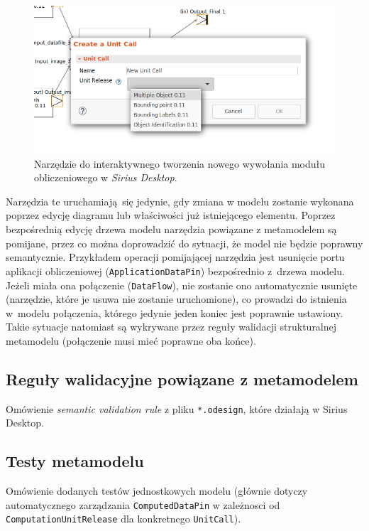 \begin{figure}[!hb]
	\centering

	\includegraphics[width=0.95\linewidth]{./images/sirius-desktop-create-unit-call-tool.png}
	\caption{Narzędzie do interaktywnego tworzenia nowego wywołania modułu
		obliczeniowego w \emph{Sirius Desktop}.}\label{rys:sirius-desktop-create-unit-call-tool}
\end{figure}

Narzędzia te uruchamiają się jedynie, gdy zmiana w modelu zostanie wykonana
poprzez edycję diagramu lub właściwości już istniejącego elementu. Poprzez
bezpośrednią edycję drzewa modelu narzędzia powiązane z metamodelem są
pomijane, przez co można doprowadzić do sytuacji, że model nie będzie poprawny
semantycznie. Przykładem operacji pomijającej narzędzia jest usunięcie portu
aplikacji obliczeniowej (\texttt{ApplicationDataPin}) bezpośrednio z~drzewa
modelu. Jeżeli miała ona połączenie (\texttt{DataFlow}), nie zostanie ono
automatycznie usunięte (narzędzie, które je usuwa nie zostanie uruchomione), co
prowadzi do istnienia w~modelu połączenia, którego jedynie jeden koniec jest
poprawnie ustawiony. Takie sytuacje natomiast są wykrywane przez reguły
walidacji strukturalnej metamodelu (połączenie musi mieć poprawne oba końce).

\subsection{Reguły walidacyjne powiązane z
	metamodelem}\label{sec:reguly-walidacyjne-metamodel}

Omówienie \textit{semantic validation rule} z pliku \texttt{*.odesign}, które
działają w Sirius Desktop.

\subsection{Testy metamodelu}

Omówienie dodanych testów jednostkowych modelu (głównie dotyczy automatycznego
zarządzania \texttt{ComputedDataPin} w zależnosci od
\texttt{ComputationUnitRelease} dla konkretnego \texttt{UnitCall}).
